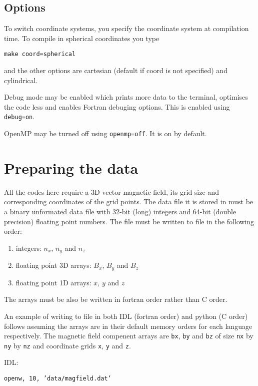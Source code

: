 \documentclass[12pt]{article}
\begin{document}
    \subsection{Options}

      To switch coordinate systems, you specify the coordinate system at compilation time. To compile in spherical coordinates you type

      \texttt{make coord=spherical}

      and the other options are cartesian (default if coord is not specified) and cylindrical.

      Debug mode may be enabled which prints more data to the terminal, optimises the code less and enables Fortran debuging options. This is enabled using \texttt{debug=on}.

      OpenMP may be turned off using \texttt{openmp=off}. It is on by default.

  \section{Preparing the data}

    All the codes here require a 3D vector magnetic field, its grid size and corresponding coordinates of the grid points. The data file it is stored in must be a binary unformated data file with 32-bit (long) integers and 64-bit (double precision) floating point numbers. The file must be written to file in the following order:
    \begin{enumerate}
      \item integers: \( n_x \), \( n_y \) and \( n_z \)
      \item floating point 3D arrays: \( B_x \), \( B_y \) and \( B_z \)
      \item floating point 1D arrays: \( x \), \( y \) and \( z \)
    \end{enumerate}
    The arrays must be also be written in fortran order rather than C order.

    An example of writing to file in both IDL (fortran order) and python (C order) follows assuming the arrays are in their default memory orders for each language respectively. The magnetic field compenent arrays are \texttt{bx}, \texttt{by} and \texttt{bz} of size \texttt{nx} by \texttt{ny} by \texttt{nz} and coordinate grids \texttt{x}, \texttt{y} and \texttt{z}.

    IDL:

    \texttt{openw, 10, 'data/magfield.dat'}
\end{document}
